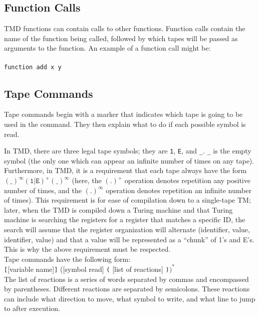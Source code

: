 \documentclass[11pt]{article}
\begin{document}
\subsection{Function Calls}

TMD functions can contain calls to other functions. Function calls contain the name of the function being called, followed by which tapes will be passed as arguments to the function. An example of a function call might be: \\ \\
\texttt{function add x y}

\subsection{Tape Commands}

Tape commands begin with a marker that indicates which tape is going to be used in the command. They then explain what to do if each possible symbol is read.

In TMD, there are three legal tape symbols; they are \texttt{1}, \texttt{E}, and \texttt{\_}. \texttt{\_} is the empty symbol (the only one which can appear an infinite number of times on any tape). Furthermore, in TMD, it is a requirement that each tape always have the form $(\texttt{\_})^{\infty}(\texttt{1}|\texttt{E})^{+}(\texttt{\_})^{\infty}$ (here, the $(.)^+$ operation denotes repetition any positive number of times, and the $(.)^\infty$ operation denotes repetition an infinite number of times). This requirement is for ease of compilation down to a single-tape TM; later, when the TMD is compiled down a Turing machine and that Turing machine is searching the registers for a register that matches a specific ID, the search will assume that the register organization will alternate (identifier, value, identifier, value) and that a value will be represented as a ``chunk'' of 1's and E's. This is why the above requirement must be respected. \\

Tape commands have the following form: \\

\texttt{[}[variable name]\texttt{]} ([symbol read] \texttt{(} [list of reactions] \texttt{)}$)^*$ \\

The list of reactions is a series of words separated by commas and encompassed by parentheses. Different reactions are separated by semicolons. These reactions can include what direction to move, what symbol to write, and what line to jump to after execution. \\
\end{document}
